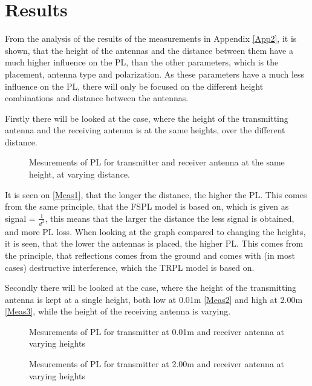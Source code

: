 \newpage
\section{Results}
From the analysis of the results of the measurements in Appendix \autoref{App2}, it is shown, that the height of the antennas and the distance between them have a much higher influence on the PL, than the other parameters, which is the placement, antenna type and polarization. As these parameters have a much less influence on the PL, there will only be focused on the different height combinations and distance between the antennas.

Firstly there will be looked at the case, where the height of the transmitting antenna and the receiving antenna is at the same heights, over the different distance.

\begin{figure}[!htbp]
\centering

\caption{Mesurements of PL for transmitter and receiver antenna at the same height, at varying distance.}
\label{Meas1}
\end{figure}

It is seen on \autoref{Meas1}, that the longer the distance, the higher the PL. This comes from the same principle, that the FSPL model is based on, which is given as signal = $\frac{1}{d^{2}}$, this means that the larger the distance the less signal is obtained, and more PL loss. When looking at the graph compared to changing the heights, it is seen, that the lower the antennas is placed, the higher PL. This comes from the principle, that reflections comes from the ground and comes with (in most cases) destructive interference, which the TRPL model is based on. 

Secondly there will be looked at the case, where the height of the transmitting antenna is kept at a single height, both low at 0.01m \autoref{Meas2} and high at 2.00m \autoref{Meas3}, while the height of the receiving antenna is varying.

\begin{figure}[!htbp]
\centering

\caption{Mesurements of PL for transmitter at 0.01m and receiver antenna at varying heights}
\label{Meas2}
\end{figure}

\begin{figure}[H]
\centering

\caption{Mesurements of PL for transmitter at 2.00m and receiver antenna at varying heights}
\label{Meas3}
\end{figure}

